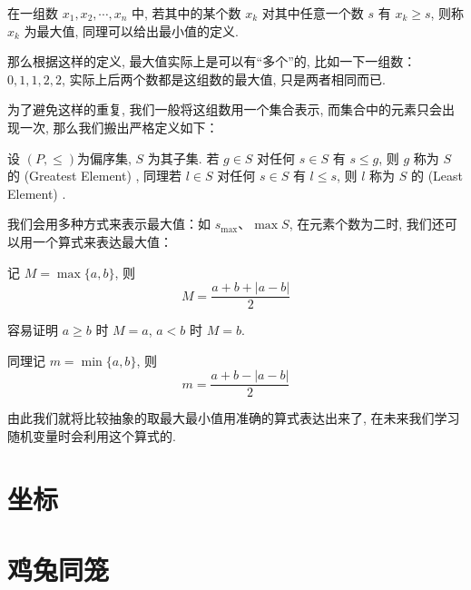 在一组数 $x_1, x_2, \cdots, x_n$ 中, 若其中的某个数 $x_k$ 对其中任意一个数 $s$ 有 $x_k \geqslant s$, 则称 $x_k$ 为最大值, 同理可以给出最小值的定义.

那么根据这样的定义, 最大值实际上是可以有“多个”的, 比如一下一组数：$0, 1, 1, 2, 2$, 实际上后两个数都是这组数的最大值, 只是两者相同而已.

为了避免这样的重复, 我们一般将这组数用一个集合表示, 而集合中的元素只会出现一次, 那么我们搬出严格定义如下：

\begin{definition}[最大元与最小元] \label{def:max-min-element}
  设 $(P,\leqslant )$为偏序集, $S$ 为其子集. 若 $g \in S$ 对任何 $s \in S$ 有 $s \leqslant g$, 则 $g$ 称为 $S$ 的  (Greatest Element) , 同理若 $l \in S$ 对任何 $s \in S$ 有 $l \leqslant s$, 则 $l$ 称为 $S$ 的  (Least Element) .
\end{definition}

我们会用多种方式来表示最大值：如 $s_{\max}$、$\max{S}$, 在元素个数为二时, 我们还可以用一个算式来表达最大值：

记 $M = \max{\{a, b\}}$, 则
\begin{equation}
  M = \frac{a + b + |a - b|}{2} \label{eq:max}
\end{equation}

容易证明 $a \geqslant b$ 时 $M = a$, $a < b$ 时 $M = b$.

同理记 $m = \min{\{a, b\}}$, 则
\begin{equation}
  m = \frac{a + b - |a - b|}{2} \label{eq:min}
\end{equation}

由此我们就将比较抽象的取最大最小值用准确的算式表达出来了, 在未来我们学习随机变量时会利用这个算式的.


\section{坐标} \label{sec:coordinate}

\section{鸡兔同笼} \label{sec:chicken-rabbit}




